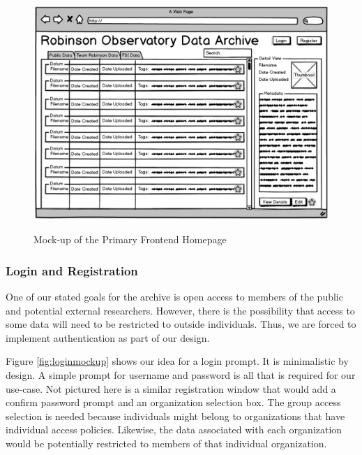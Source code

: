 \documentclass[12pt]{report}
\begin{document}
\begin{figure}[h]
	\centering
	\caption{Mock-up of the Primary Frontend Homepage}
	\includegraphics[width=\linewidth]{frontend_mockup}
	\label{fig:frontendmockup}
\end{figure}

\subsubsection*{Login and Registration}

One of our stated goals for the archive is open access to members of the public and potential external researchers. However, there is the possibility that access to some data will need to be restricted to outside individuals. Thus, we are forced to implement authentication as part of our design.

Figure \ref{fig:loginmockup} shows our idea for a login prompt. It is minimalistic by design. A simple prompt for username and password is all that is required for our use-case. Not pictured here is a similar registration window that would add a confirm password prompt and an organization selection box. The group access selection is needed because individuals might belong to organizations that have individual access policies. Likewise, the data associated with each organization would be potentially restricted to members of that individual organization.
\end{document}
